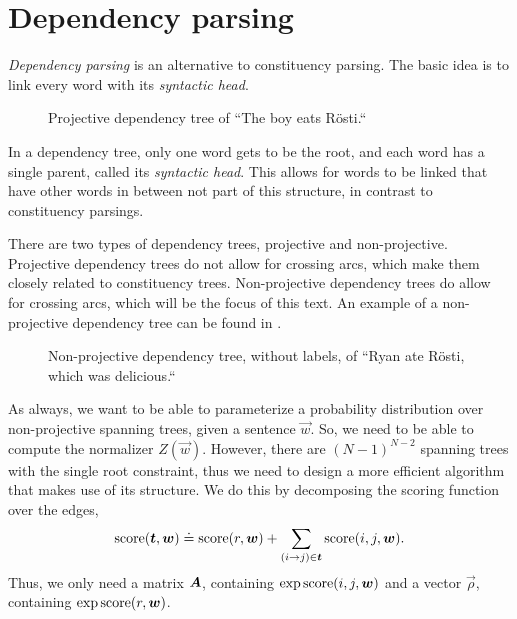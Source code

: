 \section{Dependency parsing}

\textit{Dependency parsing} is an alternative to constituency parsing. The
basic idea is to link every word with its \textit{syntactic head}.

\begin{figure}[h!]
    \centering
    \caption{Projective dependency tree of ``The boy eats Rösti.``}
    \label{fig:dependency-parse}
\end{figure}

In a dependency tree, only one word gets to be the root, and each word has a
single parent, called its \textit{syntactic head}. This allows for words to be
linked that have other words in between not part of this structure, in contrast
to constituency parsings.

There are two types of dependency trees, projective and non-projective.
Projective dependency trees do not allow for crossing arcs, which make them
closely related to constituency trees. Non-projective dependency trees do allow
for crossing arcs, which will be the focus of this text. An example of a
non-projective dependency tree can be found in
.

\begin{figure}[ht]
    \centering
    \caption{Non-projective dependency tree, without labels, of ``Ryan ate
    Rösti, which was delicious.``}
    \label{fig:non-projective-dependency-tree}
\end{figure}

As always, we want to be able to parameterize a probability distribution over
non-projective spanning trees, given a sentence $\vec{w}$. So, we need to be
able to compute the normalizer $Z(\vec{w})$. However, there are $(N-1)^{N-2}$
spanning trees with the single root constraint, thus we need to design a more
efficient algorithm that makes use of its structure. We do this by decomposing
the scoring function over the edges, \[
  \mathrm{score}(\bm{t},\bm{w}) \doteq \mathrm{score}(r,\bm{w}) + \sum_{(i\to j)\in\bm{t}} \mathrm{score}(i,j,\bm{w})
.\]
Thus, we only need a matrix $\bm{A}$, containing $\exp \mathrm{score}(i,j,\bm{w})$ and a
vector $\vec{\rho}$, containing $\exp \mathrm{score}(r,\bm{w})$.

